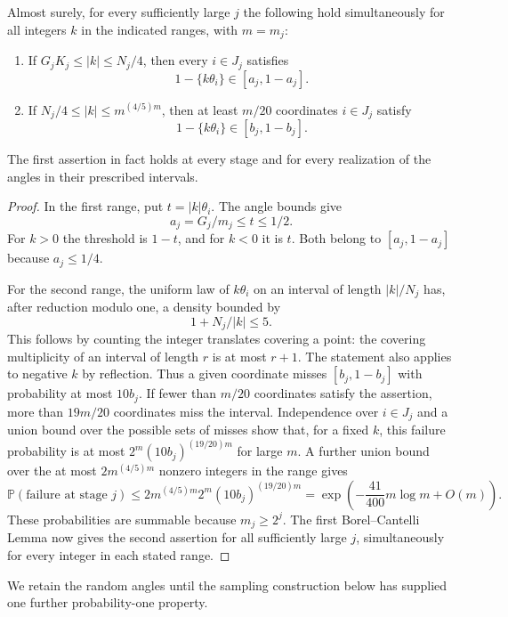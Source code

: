 \begin{proposition}\label{p:prop:phases}
Almost surely, for every sufficiently large $j$ the following hold
simultaneously for all integers $k$ in the indicated ranges, with
$m=m_j$:
\begin{enumerate}
\item If $G_jK_j\le |k|\le N_j/4$, then every $i\in J_j$ satisfies
\[
 1-\{k\theta_i\}\in[a_j,1-a_j].
\]
\item If $N_j/4\le |k|\le m^{(4/5)m}$, then at least $m/20$
coordinates $i\in J_j$ satisfy
\[
 1-\{k\theta_i\}\in[b_j,1-b_j].
\]
\end{enumerate}
The first assertion in fact holds at every stage and for every
realization of the angles in their prescribed intervals.
\end{proposition}

\begin{proof}
In the first range, put $t=|k|\theta_i$.  The angle bounds give
\[
 a_j=G_j/m_j\le t\le1/2.
\]
For $k>0$ the threshold is $1-t$, and for $k<0$ it is $t$.
Both belong to $[a_j,1-a_j]$ because $a_j\le1/4$.

For the second range, the uniform law of $k\theta_i$ on an interval
of length $|k|/N_j$ has, after reduction modulo one, a density bounded
by
\[
 1+N_j/|k|\le5.
\]
This follows by counting the integer translates covering a point:
the covering multiplicity of an interval of length $r$ is at most
$r+1$.  The statement also applies to negative $k$ by reflection.
Thus a given coordinate misses $[b_j,1-b_j]$ with probability at
most $10b_j$.  If fewer than $m/20$ coordinates satisfy the assertion,
more than $19m/20$ coordinates miss the interval.  Independence over
$i\in J_j$ and a union bound over the possible sets of misses show
that, for a fixed $k$, this failure probability is at most
$2^m(10b_j)^{(19/20)m}$ for large $m$.  A further union bound over
the at most $2m^{(4/5)m}$ nonzero integers in the range gives
\[
 \mathbb P(\text{failure at stage }j)
 \le2m^{(4/5)m}2^m(10b_j)^{(19/20)m}
 =\exp\left(-\frac{41}{400}m\log m+O(m)\right).
\]
These probabilities are summable because $m_j\ge2^j$.
The first Borel--Cantelli Lemma now gives the second assertion for
all sufficiently large $j$, simultaneously for every integer in
each stated range.
\end{proof}

We retain the random angles until the sampling construction below
has supplied one further probability-one property.
